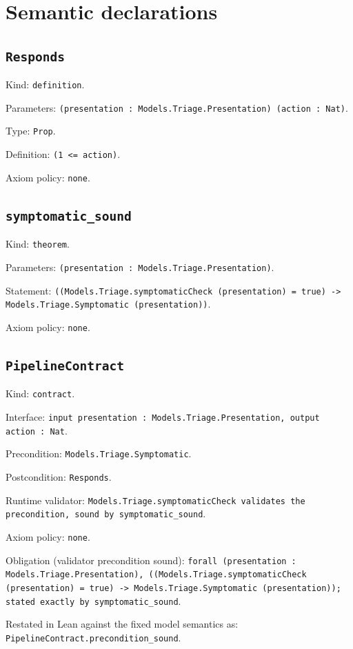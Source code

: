 \documentclass[11pt]{article}
\begin{document}
\section*{Semantic declarations}
\subsection*{\texttt{Responds}}
\noindent Kind: \texttt{definition}.\par
\noindent Parameters: \texttt{(presentation : Models.Triage.Presentation) (action : Nat)}.\par
\noindent Type: \texttt{Prop}.\par
\noindent Definition: \texttt{(1 <= action)}.\par
\noindent Axiom policy: \texttt{none}.\par
\subsection*{\texttt{symptomatic\_sound}}
\noindent Kind: \texttt{theorem}.\par
\noindent Parameters: \texttt{(presentation : Models.Triage.Presentation)}.\par
\noindent Statement: \texttt{((Models.Triage.symptomaticCheck (presentation) = true) -> Models.Triage.Symptomatic (presentation))}.\par
\noindent Axiom policy: \texttt{none}.\par
\subsection*{\texttt{PipelineContract}}
\noindent Kind: \texttt{contract}.\par
\noindent Interface: \texttt{input presentation : Models.Triage.Presentation, output action : Nat}.\par
\noindent Precondition: \texttt{Models.Triage.Symptomatic}.\par
\noindent Postcondition: \texttt{Responds}.\par
\noindent Runtime validator: \texttt{Models.Triage.symptomaticCheck validates the precondition, sound by symptomatic\_sound}.\par
\noindent Axiom policy: \texttt{none}.\par
\noindent Obligation (validator precondition sound): \texttt{forall (presentation : Models.Triage.Presentation), ((Models.Triage.symptomaticCheck (presentation) = true) -> Models.Triage.Symptomatic (presentation)); stated exactly by symptomatic\_sound}.\par
\noindent Restated in Lean against the fixed model semantics as: \texttt{PipelineContract.precondition\_sound}.\par
\end{document}
